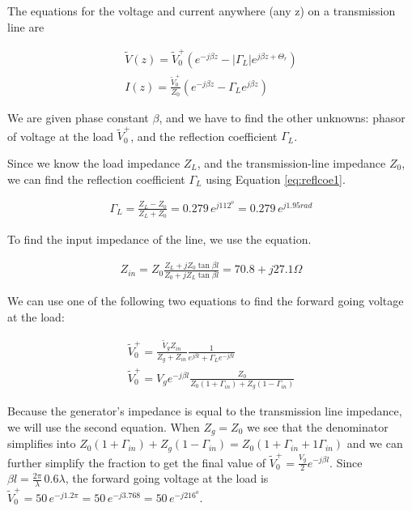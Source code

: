 \documentclass{ximera}
\begin{document}
\begin{example}
\begin{explanation}

The equations for the voltage and current anywhere (any z) on a transmission line  are


\begin{eqnarray}
\tilde{V}(z)= \tilde{V}_0^+ (e^{-j \beta z} - |\Gamma_L|  e^{j \beta z + \Theta_r}  ) \label{eq:vtlfin} \\
I(z)=   \frac{\tilde{V}_0^+}{Z_0}  (e^{-j \beta z} - \Gamma_L  e^{j \beta z}  ) \label{eq:itlfin}
\end{eqnarray}

We are given phase constant $\beta$, and we have to find the other unknowns: phasor of voltage at the load $\tilde{V}_0^+$, and the reflection coefficient $\Gamma_L$.    

Since we know the load impedance $Z_L$, and the transmission-line impedance $Z_0$, we can find the reflection coefficient $\Gamma_L$ using Equation \ref{eq:reflcoe1}.

\begin{eqnarray}
\Gamma_L =  \frac{Z_L -Z_0}{Z_L +Z_0}=0.279 \, e^{j112^o}=0.279 \, e^{j1.95 \unit{rad}} \label{eq:reflcoe1}
\end{eqnarray}

To find the input impedance of the line, we use the equation. 


\begin{eqnarray}
Z_{in}= Z_0 \frac{Z_L+ j Z_0 \tan \beta l}{Z_0+ j Z_L \tan \beta l} = 70.8+ j 27.1 \Omega
\end{eqnarray}

We can use one of the following two equations to find the forward going voltage at the load:

\begin{eqnarray}
\tilde{V}_0^+= \frac{\tilde{V}_g Z_{in}}{Z_g + Z_{in}} \frac{1}{e^{j \beta l} + \Gamma_L e^{-j \beta l}} \\
\tilde{V}_0^+=V_g e^{-j \beta l} \frac{Z_0}{Z_0 (1+\Gamma_{in}) +Z_g (1-\Gamma_{in})}
\end{eqnarray}

Because the generator's impedance is equal to the transmission line impedance, we will use the second equation. When $Z_g=Z_0$ we see that the denominator simplifies into $Z_0 (1+\Gamma_{in}) +Z_g (1-\Gamma_{in}) = Z_0 (1+\Gamma_{in}+1\Gamma_{in})$ and we can further simplify the fraction to get the final value of $\tilde{V}_0^+=\frac{V_g}{2} e^{-j \beta l}$. Since $\beta l = \frac{2 \pi}{\lambda} \, 0.6 \lambda$, the forward going voltage at the load is $\tilde{V}_0^+=50 \, e^{-j1.2 \pi} = 50 \, e^{-j3.768} =50 \, e^{-j216^o} $.




\end{explanation}
\end{example}
\end{document}
